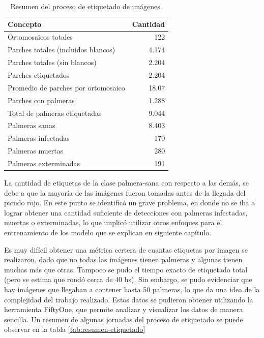 \begin{table}[H]
  \centering
  \caption[Proceso de etiquetado]{Resumen del proceso de etiquetado de imágenes.}
  \begin{tabular}{l r}
    \toprule
    \textbf{Concepto}                   & \textbf{Cantidad} \\
    \midrule
    Ortomosaicos totales                & 122               \\
    Parches totales (incluidos blancos) & 4.174             \\
    Parches totales (sin blancos)       & 2.204             \\
    Parches etiquetados                 & 2.204             \\
    Promedio de parches por ortomosaico & 18.07             \\
    Parches con palmeras                & 1.288             \\
    Total de palmeras etiquetadas       & 9.044             \\
    Palmeras sanas                      & 8.403             \\
    Palmeras infectadas                 & 170               \\
    Palmeras muertas                    & 280               \\
    Palmeras exterminadas               & 191               \\
    \bottomrule
    \hline
  \end{tabular}
  \label{tab:resumen-imagenes-etiquetado}
\end{table}

La cantidad de etiquetas de la clase palmera-sana con respecto a las demás, se debe a que la mayoría de las imágenes fueron tomadas antes de la llegada del picudo rojo. En este punto se identificó un grave problema, en donde no se iba a lograr obtener una cantidad suficiente de detecciones con palmeras infectadas, muertas o exterminadas, lo que implicó utilizar otros enfoques para el entrenamiento de los modelo que se explican en siguiente capítulo.

Es muy difícil obtener una métrica certera de cuantas etiquetas por imagen se realizaron, dado que no todas las imágenes tienen palmeras y algunas tienen muchas más que otras. Tampoco se pudo el tiempo exacto de etiquetado total (pero se estima que rondó cerca de 40 hs). Sin embargo, se pudo evidenciar que hay imágenes que llegaban a contener hasta 50 palmeras, lo que da una idea de la complejidad del trabajo realizado. Estos datos se pudieron obtener utilizando la herramienta FiftyOne, que permite analizar y visualizar los datos de manera sencilla. Un resumen de algunas jornadas del proceso de etiquetado se puede observar en la tabla \ref{tab:resumen-etiquetado}

